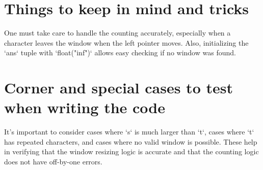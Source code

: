 \section*{Things to keep in mind and tricks}
One must take care to handle the counting accurately, especially when a character leaves the window when the left pointer moves. Also, initializing the `ans` tuple with `float("inf")` allows easy checking if no window was found.

\section*{Corner and special cases to test when writing the code}
It's important to consider cases where `s` is much larger than `t`, cases where `t` has repeated characters, and cases where no valid window is possible. These help in verifying that the window resizing logic is accurate and that the counting logic does not have off-by-one errors.